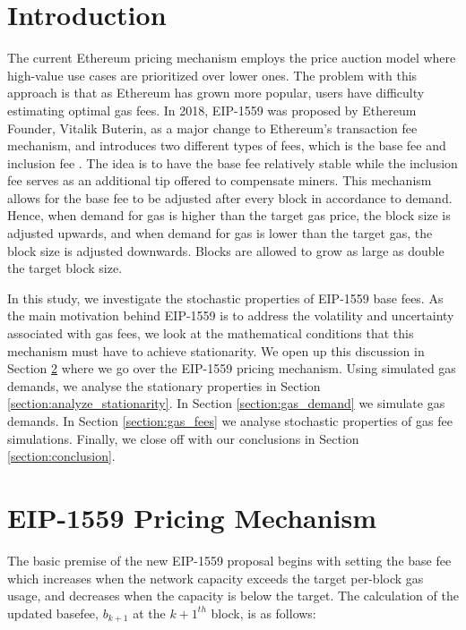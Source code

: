\documentclass[futureinternet,article,submit,moreauthors,dvi2pdf]{mdpi}
\begin{document}
\section{Introduction}

The current Ethereum pricing mechanism employs the price auction model where high-value use cases are prioritized over lower ones. The problem with this approach is that as Ethereum has grown more popular, users have difficulty estimating optimal gas fees. In 2018, EIP-1559 was  proposed by Ethereum Founder, Vitalik Buterin, as a major change to Ethereum's transaction fee mechanism, and introduces two different types of fees, which is the base fee and inclusion fee \cite{But19,Rou20}. The idea is to have the base fee relatively stable while the inclusion fee serves as an additional tip offered to compensate miners. This mechanism allows for the base fee to be adjusted after every block in accordance to demand. Hence, when demand for gas is higher than the target gas price, the block size is adjusted upwards, and when demand for gas is lower than the target gas, the block size is adjusted downwards. Blocks are allowed to grow as large as double the target block size.

In this study, we investigate the stochastic properties of EIP-1559 base fees. As the main motivation behind EIP-1559 is to address the volatility and uncertainty associated with gas fees, we look at the mathematical conditions that this mechanism must have to achieve stationarity. We open up this discussion in Section \ref{section:eip_1559} where we go over the EIP-1559 pricing mechanism. Using simulated gas demands, we analyse the stationary properties in Section \ref{section:analyze_stationarity}. In Section \ref{section:gas_demand} we simulate  gas demands.  In Section \ref{section:gas_fees} we analyse stochastic properties of gas fee simulations.  Finally, we close off with our conclusions in Section \ref{section:conclusion}.

\section{EIP-1559 Pricing Mechanism}
\label{section:eip_1559}

The basic premise of the new EIP-1559 proposal begins with setting the base fee which increases when the network capacity exceeds the target per-block gas usage, and decreases when the capacity is below the target. The calculation of the updated basefee, $b_{k+1}$ at the $k+1^{th}$ block, is as follows:
\end{document}
